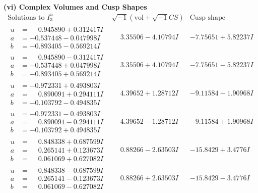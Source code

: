 \documentclass[1p]{elsarticle_modified}
\theoremstyle{definition}
\newcommand{\I}{\sqrt{-1}}
\begin{document}
\newpage\flushleft \textbf{(vi) Complex Volumes and Cusp Shapes}
$$\begin{array}{c|c|c}  
\text{Solutions to }I^u_{3}& \I (\text{vol} + \sqrt{-1}CS) & \text{Cusp shape}\\
 \hline 
\begin{aligned}
u &= \phantom{-}0.945890 + 0.312417 I \\
a &= -0.537448 - 0.047998 I \\
b &= -0.893405 - 0.569214 I\end{aligned}
 & \phantom{-}3.35506 - 4.10794 I & -7.75651 + 5.82237 I \\ \hline\begin{aligned}
u &= \phantom{-}0.945890 - 0.312417 I \\
a &= -0.537448 + 0.047998 I \\
b &= -0.893405 + 0.569214 I\end{aligned}
 & \phantom{-}3.35506 + 4.10794 I & -7.75651 - 5.82237 I \\ \hline\begin{aligned}
u &= -0.972331 + 0.493803 I \\
a &= \phantom{-}0.890091 + 0.294111 I \\
b &= -0.103792 - 0.494835 I\end{aligned}
 & \phantom{-}4.39652 + 1.28712 I & -9.11584 - 1.90968 I \\ \hline\begin{aligned}
u &= -0.972331 - 0.493803 I \\
a &= \phantom{-}0.890091 - 0.294111 I \\
b &= -0.103792 + 0.494835 I\end{aligned}
 & \phantom{-}4.39652 - 1.28712 I & -9.11584 + 1.90968 I \\ \hline\begin{aligned}
u &= \phantom{-}0.848338 + 0.687599 I \\
a &= \phantom{-}0.265141 + 0.123673 I \\
b &= \phantom{-}0.061069 + 0.627082 I\end{aligned}
 & \phantom{-}0.88266 - 2.63503 I & -15.8429 + 3.4776 I \\ \hline\begin{aligned}
u &= \phantom{-}0.848338 - 0.687599 I \\
a &= \phantom{-}0.265141 - 0.123673 I \\
b &= \phantom{-}0.061069 - 0.627082 I\end{aligned}
 & \phantom{-}0.88266 + 2.63503 I & -15.8429 - 3.4776 I \\ \hline\begin{aligned}

\end{aligned}
\end{array}$$
\end{document}
